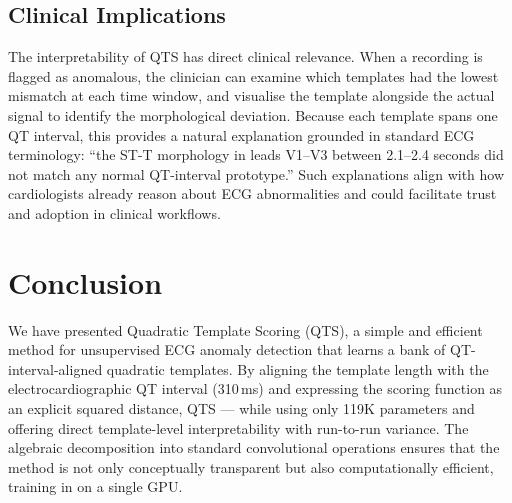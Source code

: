 \documentclass{iopjournal}
\begin{document}
\subsection{Clinical Implications}

The interpretability of QTS has direct clinical relevance. When a recording is flagged as anomalous, the clinician can examine which templates had the lowest mismatch at each time window, and visualise the template alongside the actual signal to identify the morphological deviation. Because each template spans one QT interval, this provides a natural explanation grounded in standard ECG terminology: ``the ST-T morphology in leads V1--V3 between 2.1--2.4 seconds did not match any normal QT-interval prototype.'' Such explanations align with how cardiologists already reason about ECG abnormalities and could facilitate trust and adoption in clinical workflows. 

\section{Conclusion}

We have presented Quadratic Template Scoring (QTS), a simple and efficient method for unsupervised ECG anomaly detection that learns a bank of QT-interval-aligned quadratic templates. By aligning the template length with the electrocardiographic QT interval (310\,ms) and expressing the scoring function as an explicit squared distance, QTS  --- while using only 119K parameters and offering direct template-level interpretability with  run-to-run variance. The algebraic decomposition into standard convolutional operations ensures that the method is not only conceptually transparent but also computationally efficient, training in  on a single GPU.
\end{document}

